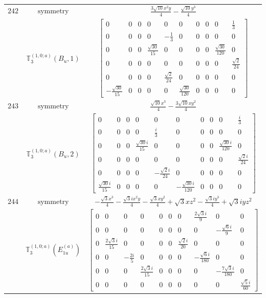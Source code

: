 \documentclass[fleqn,8pt,landscape]{jsarticle}
\begin{document}
\begin{longtable}{ccc}
$ 242 $ & $ \text{symmetry} $ & $ \frac{3 \sqrt{10} x^{2} y}{4} - \frac{\sqrt{10} y^{3}}{4} $ \\
$  $ & $ \mathbb{T}_{3}^{(1,0;a)}(B_{u},1) $ & $ \begin{bmatrix} 0 & 0 & 0 & 0 & 0 & 0 & 0 & 0 & 0 & \frac{1}{3} \\ 0 & 0 & 0 & 0 & - \frac{1}{3} & 0 & 0 & 0 & 0 & 0 \\ 0 & 0 & 0 & \frac{\sqrt{30}}{15} & 0 & 0 & 0 & 0 & \frac{\sqrt{30}}{120} & 0 \\ 0 & 0 & 0 & 0 & 0 & 0 & 0 & 0 & 0 & \frac{\sqrt{2}}{24} \\ 0 & 0 & 0 & 0 & \frac{\sqrt{2}}{24} & 0 & 0 & 0 & 0 & 0 \\ - \frac{\sqrt{30}}{15} & 0 & 0 & 0 & 0 & \frac{\sqrt{30}}{120} & 0 & 0 & 0 & 0 \end{bmatrix} $ \\ \hline
$ 243 $ & $ \text{symmetry} $ & $ \frac{\sqrt{10} x^{3}}{4} - \frac{3 \sqrt{10} x y^{2}}{4} $ \\
$  $ & $ \mathbb{T}_{3}^{(1,0;a)}(B_{u},2) $ & $ \begin{bmatrix} 0 & 0 & 0 & 0 & 0 & 0 & 0 & 0 & 0 & \frac{i}{3} \\ 0 & 0 & 0 & 0 & \frac{i}{3} & 0 & 0 & 0 & 0 & 0 \\ 0 & 0 & 0 & \frac{\sqrt{30} i}{15} & 0 & 0 & 0 & 0 & \frac{\sqrt{30} i}{120} & 0 \\ 0 & 0 & 0 & 0 & 0 & 0 & 0 & 0 & 0 & \frac{\sqrt{2} i}{24} \\ 0 & 0 & 0 & 0 & - \frac{\sqrt{2} i}{24} & 0 & 0 & 0 & 0 & 0 \\ \frac{\sqrt{30} i}{15} & 0 & 0 & 0 & 0 & - \frac{\sqrt{30} i}{120} & 0 & 0 & 0 & 0 \end{bmatrix} $ \\ \hline
$ 244 $ & $ \text{symmetry} $ & $ - \frac{\sqrt{3} x^{3}}{4} - \frac{\sqrt{3} i x^{2} y}{4} - \frac{\sqrt{3} x y^{2}}{4} + \sqrt{3} x z^{2} - \frac{\sqrt{3} i y^{3}}{4} + \sqrt{3} i y z^{2} $ \\
$  $ & $ \mathbb{T}_{3}^{(1,0;a)}(E_{1u}^{(a)}) $ & $ \begin{bmatrix} 0 & 0 & 0 & 0 & 0 & 0 & 0 & \frac{2 \sqrt{3} i}{9} & 0 & 0 \\ 0 & 0 & 0 & 0 & 0 & 0 & 0 & 0 & - \frac{\sqrt{6} i}{9} & 0 \\ 0 & \frac{2 \sqrt{3} i}{15} & 0 & 0 & 0 & 0 & \frac{\sqrt{2} i}{20} & 0 & 0 & 0 \\ 0 & 0 & - \frac{2 i}{5} & 0 & 0 & 0 & 0 & - \frac{\sqrt{6} i}{180} & 0 & 0 \\ 0 & 0 & 0 & \frac{2 \sqrt{3} i}{15} & 0 & 0 & 0 & 0 & - \frac{7 \sqrt{3} i}{180} & 0 \\ 0 & 0 & 0 & 0 & 0 & 0 & 0 & 0 & 0 & \frac{\sqrt{5} i}{60} \end{bmatrix} $ \\ \hline

\end{longtable}
\end{document}
